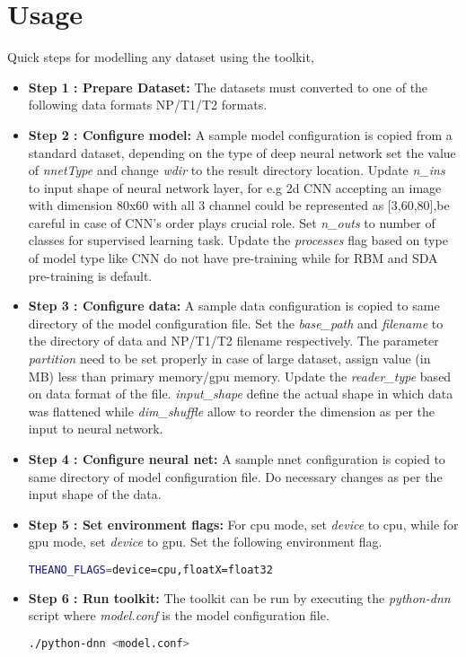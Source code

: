 \section{Usage}
Quick steps for modelling any dataset using the toolkit,
\begin{itemize}
	\item{\textbf{Step 1 : Prepare Dataset:} The datasets must converted to one of the following data formats NP/T1/T2 formats. }
	\item{\textbf{Step 2 : Configure model:} A sample model configuration is copied from a standard dataset, depending on the type of deep neural network set the value of \textit{nnetType} and change \textit{wdir} to the result directory location. Update \textit{n\_ins} to input shape of neural network layer, for e.g 2d CNN accepting an image with dimension 80x60 with all 3 channel could be represented as [3,60,80],be careful in case of CNN's order plays crucial role. Set \textit{n\_outs} to number of classes for supervised learning task. Update the \textit{processes} flag based on type of model type like CNN do not have pre-training while for RBM and SDA pre-training is default.}
	\item {\textbf{Step 3 : Configure data:} A sample data configuration is copied to same directory of the model configuration file. Set the \textit{base\_path} and \textit{filename} to the directory of data and NP/T1/T2 filename respectively. The parameter \textit{partition} need to be set properly in case of large dataset, assign value (in MB) less than primary memory/gpu memory. Update the \textit{reader\_type} based on data format of the file. \textit{input\_shape} define the actual shape in which data was flattened while \textit{dim\_shuffle} allow to reorder the dimension as per the input to neural network.}
	\item{\textbf{Step 4 : Configure neural net:} A sample nnet configuration is copied to same directory of model configuration file. Do necessary changes as per the input shape of the data.}	
	\item{\textbf{Step 5 : Set environment flags:} For cpu mode, set \textit{device} to cpu, while for gpu mode, set \textit{device} to gpu. Set the following environment flag.
	\begin{lstlisting}[language=bash,basicstyle=\small] 
		THEANO_FLAGS=device=cpu,floatX=float32
	\end{lstlisting}} 
	
	\item{\textbf{Step 6 : Run toolkit:} The toolkit can be run by executing the \textit{python-dnn} script where \textit{model.conf} is the model configuration file.
	\begin{lstlisting}[language=bash,basicstyle=\small] 
		./python-dnn <model.conf>
	\end{lstlisting}	} 
\end{itemize}

